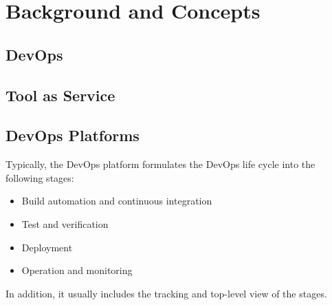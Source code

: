 \chapter{Background and Concepts}
\section{DevOps}
\section{Tool as Service}
\section{DevOps Platforms}
Typically, the DevOps platform formulates the DevOps life cycle into the following stages:\cite{DevOps1016:online}
\begin{itemize}
    \item Build automation and continuous integration
    \item Test and verification
    \item Deployment
    \item Operation and monitoring 
\end{itemize}
In addition, it usually includes the tracking and top-level view of the stages.





